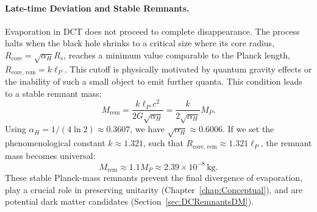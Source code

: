 \documentclass[a4paper, 12pt, oneside]{book}
\numberwithin{equation}{chapter}
\begin{document}
\paragraph{Late-time Deviation and Stable Remnants.}
Evaporation in DCT does not proceed to complete disappearance. The process halts when the black hole shrinks to a critical size where its core radius, $R_{\text{core}} = \sqrt{\alpha_H} R_s$, reaches a minimum value comparable to the Planck length, $R_{\text{core, rem}} = k \ell_P$. This cutoff is physically motivated by quantum gravity effects or the inability of such a small object to emit further quanta. This condition leads to a stable remnant mass:
\[
    M_{\text{rem}} = \frac{k \ell_P c^2}{2G\sqrt{\alpha_H}} = \frac{k}{2\sqrt{\alpha_H}} M_P.
\]
Using $\alpha_H = 1/(4\ln 2) \approx 0.3607$, we have $\sqrt{\alpha_H} \approx 0.6006$. If we set the phenomenological constant $k \approx 1.321$, such that $R_{\text{core, rem}} \approx 1.321 \ell_P$, the remnant mass becomes universal:
\[
    M_{\text{rem}} \approx 1.1 M_P \approx 2.39 \times 10^{-8}\,\mathrm{kg}.
\]
These stable Planck-mass remnants prevent the final divergence of evaporation, play a crucial role in preserving unitarity (Chapter~\ref{chap:Conceptual}), and are potential dark matter candidates (Section~\ref{sec:DCRemnantsDM}).
\end{document}
